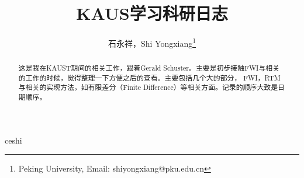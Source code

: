 \documentclass[UTF8, 10pt, a4paper]{article}
\title{KAUS学习科研日志}
\author{石永祥，Shi Yongxiang\footnote{Peking University, Email: shiyongxiang@pku.edu.cn}}
\begin{document}
    \maketitle
    \begin{abstract}
        这是我在KAUST期间的相关工作，跟着Gerald Schuster。主要是初步接触FWI与相关的工作的时候，觉得整理一下方便之后的查看。主要包括几个大的部分， FWI，RTM与相关的实现方法，如有限差分（Finite Difference）等相关方面。记录的顺序大致是日期顺序。
    \end{abstract}
    ceshi    
\end{document}
